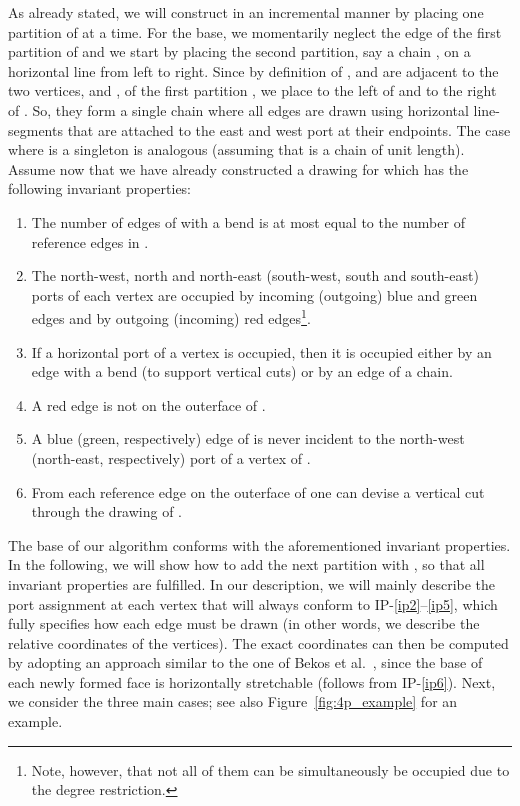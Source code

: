 \documentclass[a4paper,twoside,11pt]{article}
\begin{document}
As already stated, we will construct  in an incremental
manner by placing one partition of  at a time. For the base, we
momentarily neglect the edge  of the first partition
 of  and we start by placing the second partition, say a
chain , on a horizontal line from left to
right. Since by definition of ,  and  are
adjacent to the two vertices,  and , of the first
partition , we place  to the left of  and  to the right of
. So, they form a single chain where all edges are
drawn using horizontal line-segments that are attached to the east
and west port at their endpoints. The case where  is a
singleton is analogous (assuming  that  is a chain of unit
length). Assume now that we have already constructed a drawing for
 which has the following invariant properties:

\begin{enumerate}[{IP-}1:] \item \label{ip1}  The number of edges of
 with a bend is at most equal to the number of reference
edges in .
\item \label{ip2} The north-west, north and north-east (south-west,
south and south-east) ports of each vertex are occupied by incoming
(outgoing) blue and green edges and by outgoing (incoming) red
edges\footnote{Note, however, that not all of them can be
simultaneously be occupied due to the degree restriction.}.
\item \label{ip3} If a horizontal port of a vertex is occupied, then
it is occupied either by an edge with a bend (to support vertical
cuts) or by an edge of a chain.
\item \label{ip4} A red edge is not on the outerface of .
\item \label{ip5} A blue (green, respectively) edge of  is
never incident to the north-west (north-east, respectively) port of
a vertex of .
\item \label{ip6} From each reference edge on the outerface of
 one can devise a vertical cut through the drawing of
.
\end{enumerate}
The base of our algorithm conforms with the aforementioned invariant
properties. In the following, we will show how to add the next
partition  with , so that all invariant properties are
fulfilled. In our description, we will mainly describe the port
assignment at each vertex that will always conform to
IP-\ref{ip2}--\ref{ip5}, which fully specifies how each edge must be
drawn (in other words, we describe the relative coordinates of the
vertices). The exact coordinates can then be computed by adopting an
approach similar to the one of Bekos et al.~\cite{BGKK14}, since the
base of each newly formed face is horizontally stretchable (follows
from IP-\ref{ip6}). Next, we consider the three main cases; see also
Figure~\ref{fig:4p_example} for an example.
\end{document}
